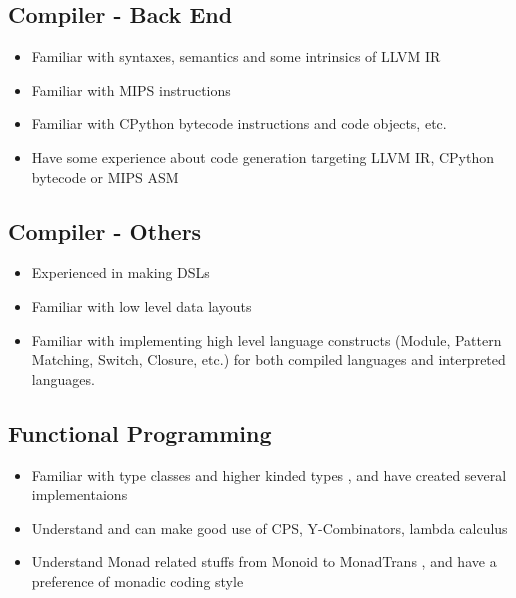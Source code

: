 \documentclass{resume}
\begin{document}
\subsection{\textbf{Compiler - Back End}}
\begin{itemize}
  \item Familiar with syntaxes, semantics and some intrinsics of LLVM IR
  \item Familiar with MIPS instructions
  \item Familiar with CPython bytecode instructions and code objects, etc.
  \item Have some experience about code generation targeting LLVM IR, CPython bytecode or MIPS ASM
\end{itemize}

\subsection{\textbf{Compiler - Others}}
\begin{itemize}
  \item Experienced in making DSLs
  \item Familiar with low level data layouts
  \item Familiar with implementing high level language constructs
        (Module, Pattern Matching, Switch, Closure, etc.) for both
        compiled languages and interpreted languages.
\end{itemize}

\subsection{\textbf{Functional Programming}}
\begin{itemize}
  \item Familiar with type classes and higher kinded types
        , and have created several implementaions
  \item Understand and can make good use of CPS, Y-Combinators, lambda calculus
  \item Understand Monad related stuffs from Monoid to MonadTrans
        , and have a preference of monadic coding style
\end{itemize}
\end{document}
